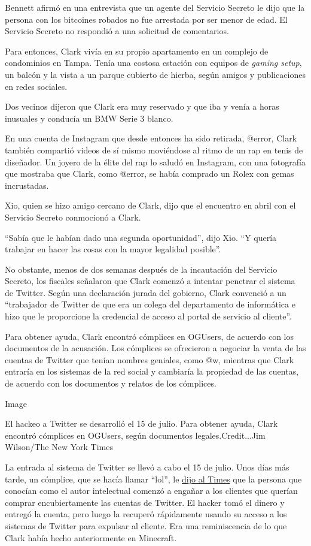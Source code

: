 Bennett afirmó en una entrevista que un agente del Servicio Secreto le
dijo que la persona con los bitcoines robados no fue arrestada por ser
menor de edad. El Servicio Secreto no respondió a una solicitud de
comentarios.

Para entonces, Clark vivía en su propio apartamento en un complejo de
condominios en Tampa. Tenía una costosa estación con equipos de
\emph{gaming setup}, un balcón y la vista a un parque cubierto de
hierba, según amigos y publicaciones en redes sociales.

Dos vecinos dijeron que Clark era muy reservado y que iba y venía a
horas inusuales y conducía un BMW Serie 3 blanco.

En una cuenta de Instagram que desde entonces ha sido retirada, @error,
Clark también compartió videos de sí mismo moviéndose al ritmo de un rap
en tenis de diseñador. Un joyero de la élite del rap lo saludó en
Instagram, con una fotografía que mostraba que Clark, como @error, se
había comprado un Rolex con gemas incrustadas.

Xio, quien se hizo amigo cercano de Clark, dijo que el encuentro en
abril con el Servicio Secreto conmocionó a Clark.

``Sabía que le habían dado una segunda oportunidad'', dijo Xio. ``Y
quería trabajar en hacer las cosas con la mayor legalidad posible''.

No obstante, menos de dos semanas después de la incautación del Servicio
Secreto, los fiscales señalaron que Clark comenzó a intentar penetrar el
sistema de Twitter. Según una declaración jurada del gobierno, Clark
convenció a un ``trabajador de Twitter de que era un colega del
departamento de informática e hizo que le proporcione la credencial de
acceso al portal de servicio al cliente''.

Para obtener ayuda, Clark encontró cómplices en OGUsers, de acuerdo con
los documentos de la acusación. Los cómplices se ofrecieron a negociar
la venta de las cuentas de Twitter que tenían nombres geniales, como @w,
mientras que Clark entraría en los sistemas de la red social y cambiaría
la propiedad de las cuentas, de acuerdo con los documentos y relatos de
los cómplices.

Image

El hackeo a Twitter se desarrolló el 15 de julio. Para obtener ayuda,
Clark encontró cómplices en OGUsers, según documentos
legales.Credit...Jim Wilson/The New York Times

La entrada al sistema de Twitter se llevó a cabo el 15 de julio. Unos
días más tarde, un cómplice, que se hacía llamar ``lol'', le
\href{https://www.nytimes3xbfgragh.onion/2020/07/17/technology/twitter-hackers-interview.html}{dijo
al Times} que la persona que conocían como el autor intelectual comenzó
a engañar a los clientes que querían comprar encubiertamente las cuentas
de Twitter. El hacker tomó el dinero y entregó la cuenta, pero luego la
recuperó rápidamente usando su acceso a los sistemas de Twitter para
expulsar al cliente. Era una reminiscencia de lo que Clark había hecho
anteriormente en Minecraft.

